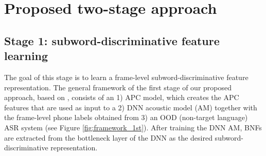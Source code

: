 \documentclass[a4paper]{article}
\begin{document}





\section{Proposed two-stage approach}
\subsection{Stage 1: subword-discriminative feature learning}
\label{subsec:approach_1st}
The goal of this stage is to learn a frame-level subword-discriminative feature representation.
The  general framework of the first stage of our proposed approach, based on \cite{feng2020unsupervised}, consists of an 1) APC model, which creates the APC features that are used as input to a  2) DNN acoustic model (AM) together with the frame-level phone labels obtained from 3) an OOD (non-target language)  ASR system
(see Figure \ref{fig:framework_1st}). After training the DNN AM, BNFs are extracted from the bottleneck layer of the DNN as the desired subword-discriminative representation.
\end{document}
